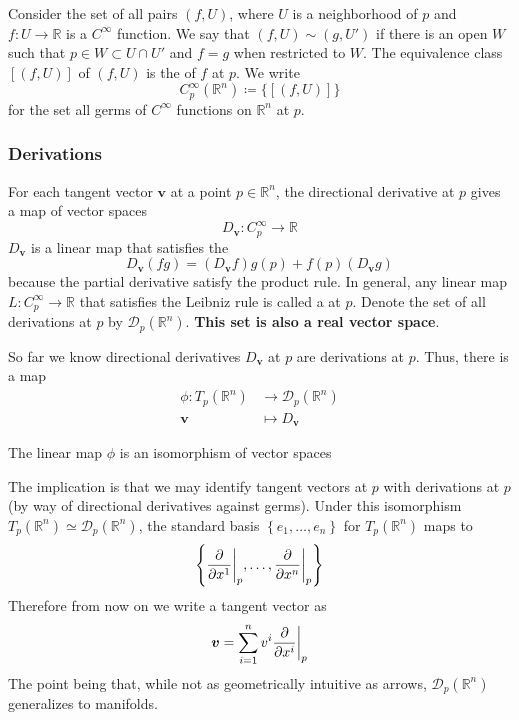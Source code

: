 Consider the set of all pairs \((f, U)\), where \(U\) is a neighborhood of \(p\) and \(f\colon U \rightarrow \mathbb{R}\) is a \(C^\infty\) function. 
%
We say that \((f, U) \sim (g, U')\) if there is an open \(W\) such that \(p \in W \subset U \cap U'\) and \(f = g\) when restricted to \(W\).
%
The equivalence class \([(f, U)]\) of \((f, U)\) is the  of \(f\) at \(p\).
%
We write 
%
\begin{equation}
   C_p^\infty(\mathbb{R}^n) \coloneqq \{[(f, U)]\}
\end{equation}
%
for the set all germs of \(C^\infty\) functions on \(\mathbb{R}^n\) at \(p\).


\subsubsection{Derivations}

For each tangent vector \(\bm{v}\) at a point \(p \in \mathbb{R}^n\), the directional derivative at \(p\) gives a map of vector spaces
%
\begin{equation*}
    D_{\bm{v}} \colon C_p^\infty \rightarrow \mathbb{R}
\end{equation*}
%
\(D_{\bm{v}}\) is a linear map that satisfies the 
%
\begin{equation}
    D_{\bm{v}}(fg) = (D_{\bm{v}}f)g(p) + f(p) (D_{\bm{v}}g)
\end{equation}
%
because the partial derivative satisfy the product rule.
%
In general, any linear map \(L\colon C_p^\infty \rightarrow \mathbb{R}\) that satisfies the Leibniz rule is called a  at \(p\).
%
Denote the set of all derivations at \(p\) by \(\mathcal{D}_p(\mathbb{R}^n)\).
%
\textbf{This set is also a real vector space}.
%

So far we know directional derivatives \(D_{\bm{v}}\) at \(p\) are derivations at \(p\).
%
Thus, there is a map
\begin{align*}
    \phi\colon T_p(\mathbb{R}^n) &\rightarrow \mathcal{D}_p (\mathbb{R}^n) \\
    \bm{v} &\mapsto D_{\bm{v}}
\end{align*}
%
\begin{theorem}
    The linear map \(\phi\) is an isomorphism of vector spaces
\end{theorem}
%
\noindent The implication is that we may identify tangent vectors at \(p\) with derivations at \(p\) (by way of directional derivatives against germs).
%
Under this isomorphism \(T_p(\mathbb{R}^n) \simeq \mathcal{D}_p(\mathbb{R}^n)\), the standard basis \(\left\{ e_1, \dots, e_n \right\}\) for \(T_p(\mathbb{R}^n)\) maps to
%
\begin{equation*}
    \left\{\evalat[\bigg]{\pdv{}{x^1}}{p}, \dots, \evalat[\bigg]{\pdv{}{x^n}}{p}  \right\} 
\end{equation*}
%
Therefore from now on we write a tangent vector as
%
\begin{equation}
   \bm{v} = \sum_{i=1}^{n} v^i \evalat[\bigg]{\pdv{}{x^i}}{p}
\end{equation}
%
The point being that, while not as geometrically intuitive as arrows, \(\mathcal{D}_p (\mathbb{R}^n)\) generalizes to manifolds.

